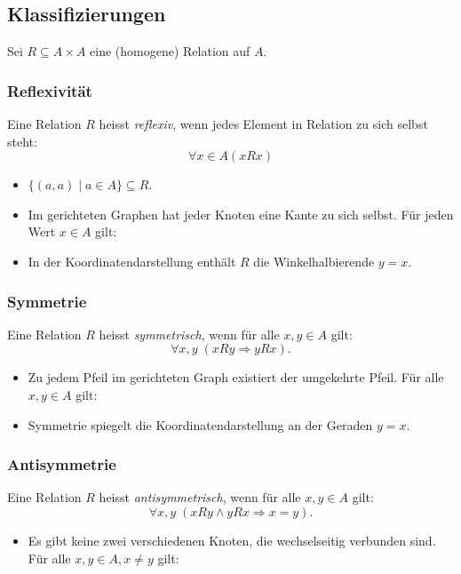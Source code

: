 \subsection{Klassifizierungen}

Sei \(R\subseteq A\times A\) eine (homogene) Relation auf \(A\).

\subsubsection{Reflexivität}
Eine Relation \(R\) heisst \emph{reflexiv}, wenn jedes Element in Relation zu sich selbst steht:
\[\forall x\in A(xRx)\]
\begin{itemize}
    \item \(\{(a,a)\mid a\in A\}\subseteq R\).
    \item Im gerichteten Graphen hat jeder Knoten eine Kante zu sich selbst. Für jeden Wert \(x\in A\) gilt:
    \item In der Koordinatendarstellung enthält \(R\) die Winkelhalbierende \(y=x\).
\end{itemize}

\subsubsection{Symmetrie}
Eine Relation \(R\) heisst \emph{symmetrisch}, wenn für alle \(x,y\in A\) gilt:
\[
  \forall x,y\;(xRy\Rightarrow yRx).
\]
\begin{itemize}
  \item Zu jedem Pfeil im gerichteten Graph existiert der umgekehrte Pfeil. Für alle \(x,y\in A\) gilt:\\
  \item Symmetrie spiegelt die Koordinatendarstellung an der Geraden \(y=x\).
\end{itemize}

\subsubsection{Antisymmetrie}
Eine Relation \(R\) heisst \emph{antisymmetrisch}, wenn für
alle \(x,y\in A\) gilt:
\[
    \forall x,y\;(xRy\land yRx\Rightarrow x=y).
\]
\begin{itemize}
  \item Es gibt keine zwei verschiedenen Knoten, die wechselseitig verbunden sind.
    Für alle \(x,y\in A, x\neq y\) gilt:\\
\end{itemize}


